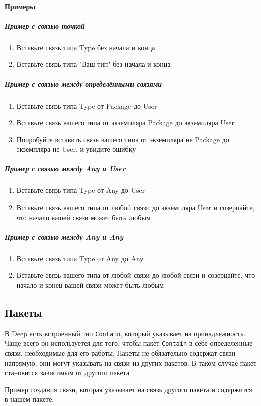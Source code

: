 \documentclass{article}
\begin{document}
\paragraph{Примеры}
\subparagraph{Пример с связью точкой}
\begin{enumerate}
  \item Вставьте связь типа Type без начала и конца
  \item Вставьте связь типа "Ваш тип" без начала и конца
\end{enumerate}
\subparagraph{Пример с связью между определёнными связями}
\begin{enumerate}
  \item Вставьте связь типа Type от Package до User
  \item Вставьте связь вашего типа от экземпляра Package до экземпляра User
  \item Попробуйте вставить связь вашего типа от экземпляра не Package до
        экземпляра не User, и увидите ошибку
\end{enumerate}
\subparagraph{Пример с связью между Any и User}
\begin{enumerate}
  \item Вставьте связь типа Type от Any до User
  \item Вставьте связь вашего типа от любой связи до экземпляра User и
        созерцайте, что начало вашей связи может быть любым
\end{enumerate}
\subparagraph{Пример с связью между Any и Any}
\begin{enumerate}
  \item Вставьте связь типа Type от Any до Any
  \item Вставьте связь вашего типа от любой связи до любой связи и
        созерцайте, что начало и конец вашей связи может быть любым
\end{enumerate}
\subsection{Пакеты}

В Deep есть встроенный тип \texttt{Contain}, который указывает на
принадлежность. Чаще всего он используется для того, чтобы пакет
\texttt{Contain} в себе определенные связи, необходимые для его работы.
Пакеты не обязательно содержат связи напрямую; они могут
указывать на связи из других пакетов. В таком случае пакет
становится зависимым от другого пакета

Пример создания связи, которая указывает на связь другого пакета и содержится в
нашем пакете:
\end{document}
